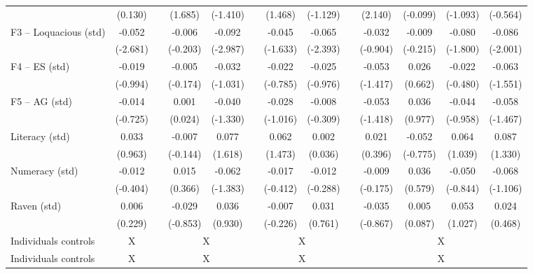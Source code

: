 \begin{table}[htbp]
{\begin{tabular}{lcccccccccccc}
          & (0.130) &       & (1.685) & (-1.410) &       & (1.468) & (-1.129) &       & (2.140) & (-0.099) & (-1.093) & (-0.564) \\
    F3 -- Loquacious (std) & \cellcolor[rgb]{ 1,  1,  0}-0.052 &       & -0.006 & \cellcolor[rgb]{ 1,  1,  0}-0.092 &       & -0.045 & \cellcolor[rgb]{ 1,  1,  0}-0.065 &       & -0.032 & -0.009 & \cellcolor[rgb]{ 1,  1,  0}-0.080 & \cellcolor[rgb]{ 1,  1,  0}-0.086 \\
          & (-2.681) &       & (-0.203) & (-2.987) &       & (-1.633) & (-2.393) &       & (-0.904) & (-0.215) & (-1.800) & (-2.001) \\
    F4 -- ES (std) & -0.019 &       & -0.005 & -0.032 &       & -0.022 & -0.025 &       & -0.053 & 0.026 & -0.022 & -0.063 \\
          & (-0.994) &       & (-0.174) & (-1.031) &       & (-0.785) & (-0.976) &       & (-1.417) & (0.662) & (-0.480) & (-1.551) \\
    F5 -- AG (std) & -0.014 &       & 0.001 & -0.040 &       & -0.028 & -0.008 &       & -0.053 & 0.036 & -0.044 & -0.058 \\
          & (-0.725) &       & (0.024) & (-1.330) &       & (-1.016) & (-0.309) &       & (-1.418) & (0.977) & (-0.958) & (-1.467) \\
    Literacy (std) & 0.033 &       & -0.007 & 0.077 &       & 0.062 & 0.002 &       & 0.021 & -0.052 & 0.064 & 0.087 \\
          & (0.963) &       & (-0.144) & (1.618) &       & (1.473) & (0.036) &       & (0.396) & (-0.775) & (1.039) & (1.330) \\
    Numeracy (std) & -0.012 &       & 0.015 & -0.062 &       & -0.017 & -0.012 &       & -0.009 & 0.036 & -0.050 & -0.068 \\
          & (-0.404) &       & (0.366) & (-1.383) &       & (-0.412) & (-0.288) &       & (-0.175) & (0.579) & (-0.844) & (-1.106) \\
    Raven (std) & 0.006 &       & -0.029 & 0.036 &       & -0.007 & 0.031 &       & -0.035 & 0.005 & 0.053 & 0.024 \\
          & (0.229) &       & (-0.853) & (0.930) &       & (-0.226) & (0.761) &       & (-0.867) & (0.087) & (1.027) & (0.468) \\
\cmidrule{1-2}\cmidrule{4-5}\cmidrule{7-8}\cmidrule{10-13}    Individuals controls & X     &       & \multicolumn{2}{c}{X} &       & \multicolumn{2}{c}{X} &       & \multicolumn{4}{c}{X} \\
    Individuals controls & X     &       & \multicolumn{2}{c}{X} &       & \multicolumn{2}{c}{X} &       & \multicolumn{4}{c}{X} \\

\end{tabular}}
\end{table}
